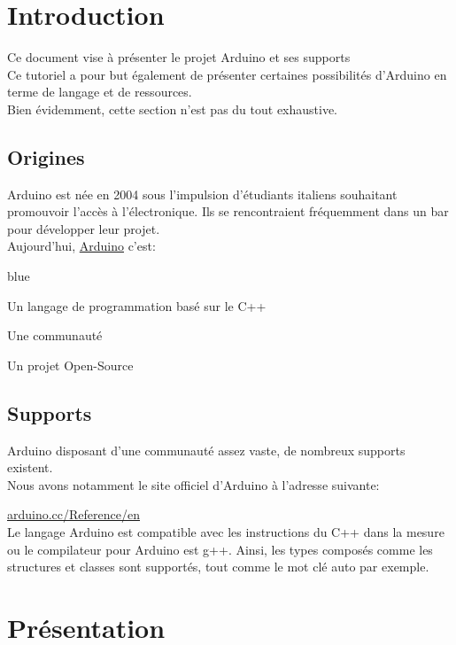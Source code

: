 \chapter{Introduction}

Ce document vise à présenter le projet Arduino et ses supports\\
Ce tutoriel a pour but également de présenter certaines possibilités d'Arduino en terme de langage et de 
ressources. \\
Bien évidemment, cette section n'est pas du tout exhaustive.

\section{Origines}

Arduino est née en 2004 sous l'impulsion d'étudiants italiens souhaitant promouvoir l'accès à  l'électronique. 
Ils se rencontraient fréquemment dans un bar pour développer leur projet. \\
Aujourd'hui, \underline{Arduino} c'est:
\begin{items}{blue}{\Triangle}
\item Un langage de programmation basé sur le C++
\item Une communauté
\item Un projet Open-Source
\end{items}

\section{Supports}

Arduino disposant d'une communauté assez vaste, de nombreux supports existent. \\
Nous avons notamment le site officiel d'Arduino à l'adresse suivante:

\underline{arduino.cc/Reference/en} \\

Le langage Arduino est compatible avec les instructions du C++ dans la mesure ou le compilateur pour Arduino est g++.
Ainsi, les types composés comme les structures et classes sont supportés, tout comme le mot clé auto par exemple.


\chapter{Présentation}

